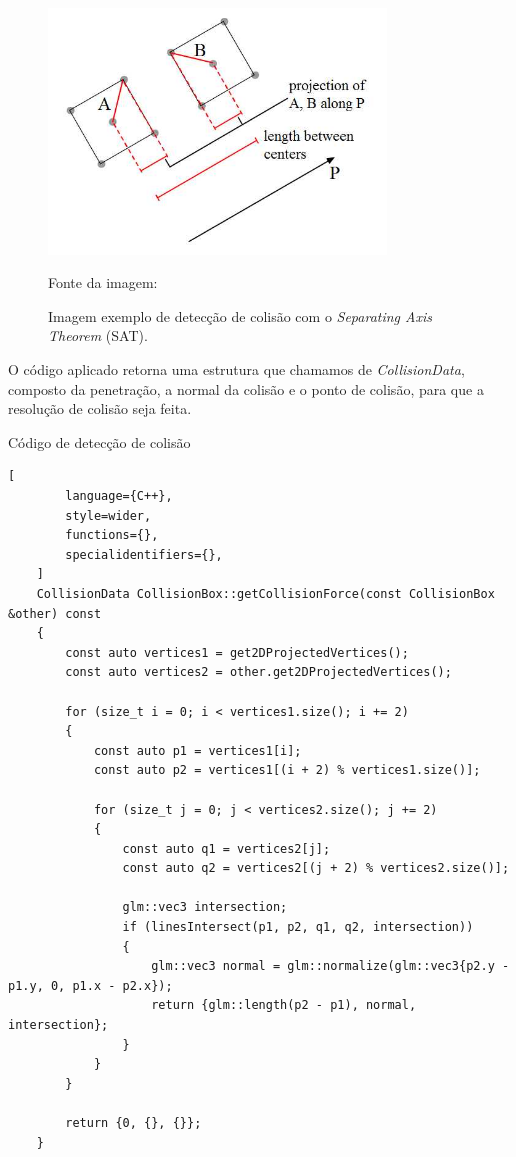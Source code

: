\begin{figure}[H]
    \centering
    \includegraphics[width=0.8\textwidth]{figuras/SAT.jpg}
    \caption{Imagem exemplo de detecção de colisão com o \textit{Separating Axis Theorem} (SAT).}
    \footnotesize{Fonte da imagem: \cite{SAT:separatingAxisTheorem}}
    \label{fig:sat_example}
\end{figure}

O código aplicado retorna uma estrutura que chamamos de \textit{CollisionData}, composto da penetração, a normal da colisão e o ponto de colisão, para que a resolução de colisão seja feita.

\pagebreak
\begin{programruledcaption}{Código de detecção de colisão}
    \begin{lstlisting}[
        language={C++},
        style=wider,
        functions={},
        specialidentifiers={},
    ]
    CollisionData CollisionBox::getCollisionForce(const CollisionBox &other) const
    {
        const auto vertices1 = get2DProjectedVertices();
        const auto vertices2 = other.get2DProjectedVertices();

        for (size_t i = 0; i < vertices1.size(); i += 2)
        {
            const auto p1 = vertices1[i];
            const auto p2 = vertices1[(i + 2) % vertices1.size()];

            for (size_t j = 0; j < vertices2.size(); j += 2)
            {
                const auto q1 = vertices2[j];
                const auto q2 = vertices2[(j + 2) % vertices2.size()];

                glm::vec3 intersection;
                if (linesIntersect(p1, p2, q1, q2, intersection))
                {
                    glm::vec3 normal = glm::normalize(glm::vec3{p2.y - p1.y, 0, p1.x - p2.x});
                    return {glm::length(p2 - p1), normal, intersection};
                }
            }
        }

        return {0, {}, {}};
    }
    \end{lstlisting}
\end{programruledcaption}


